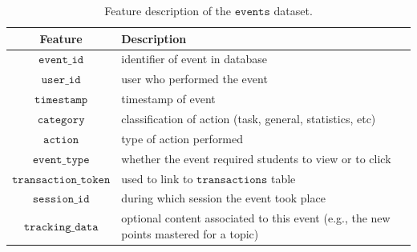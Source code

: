 \documentclass[sigplan,screen]{acmart}
\begin{document}
\begin{table}[h]
  \caption{Feature description of the $\texttt{events}$ dataset.}
  \label{tab:events}
  \begin{tabular}{cl}
    \toprule
    \textbf{Feature}&\textbf{Description}\\
    \midrule
    $\texttt{event\_id}$ & identifier of event in database \\
    $\texttt{user\_id}$ & user who performed the event \\
    $\texttt{timestamp}$ & timestamp of event \\
    $\texttt{category}$ & classification of action (task, general, statistics, etc) \\
    $\texttt{action}$ & type of action performed \\
    $\texttt{event\_type}$ & whether the event required students to view or to click \\
    $\texttt{transaction\_token}$ & used to link to $\texttt{transactions}$ table \\
    $\texttt{session\_id}$ & during which session the event took place \\
    $\texttt{tracking\_data}$ & optional content associated to this event (e.g., the new points mastered for a topic) \\
    \bottomrule
    \end{tabular}
\end{table}
\end{document}
